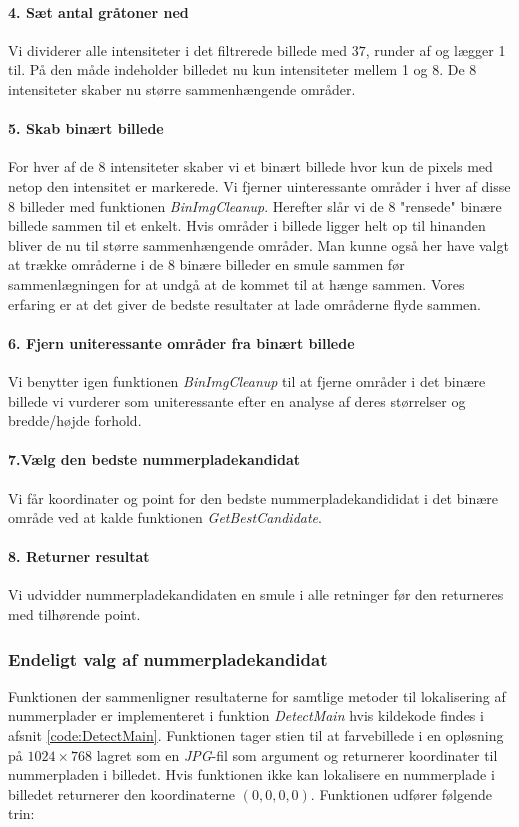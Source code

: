 \paragraph{4. Sæt antal gråtoner ned}
Vi dividerer alle intensiteter i det filtrerede billede med $37$, runder af og lægger 1 til. På den måde indeholder billedet nu kun intensiteter mellem 1 og 8. De 8 intensiteter skaber nu større sammenhængende områder.  

\paragraph{5. Skab binært billede}
For hver af de 8 intensiteter skaber vi et binært billede hvor kun de pixels med netop den intensitet er markerede. Vi fjerner uinteressante områder i hver af disse 8 billeder med funktionen \textit{BinImgCleanup}. Herefter slår vi de 8 "rensede" binære billede sammen til et enkelt. Hvis områder i billede ligger helt op til hinanden bliver de nu til større sammenhængende områder. Man kunne også her have valgt at trække områderne i de 8 binære billeder en smule sammen før sammenlægningen for at undgå at de kommet til at hænge sammen. Vores erfaring er at det giver de bedste resultater at lade områderne flyde sammen.   

\paragraph{6. Fjern uniteressante områder fra binært billede}
Vi benytter igen funktionen \textit{BinImgCleanup} til at fjerne områder i det binære billede vi vurderer som uniteressante efter en analyse af deres størrelser og bredde/højde forhold.

\paragraph{7.Vælg den bedste nummerpladekandidat}
Vi får koordinater og point for den bedste nummerpladekandididat i det binære område ved at kalde funktionen \textit{GetBestCandidate}. 

\paragraph{8. Returner resultat}
Vi udvidder nummerpladekandidaten en smule i alle retninger før den returneres med tilhørende point.

\subsubsection{Endeligt valg af nummerpladekandidat}
Funktionen der sammenligner resultaterne for samtlige metoder til lokalisering af nummerplader er implementeret i funktion \textit{DetectMain} hvis kildekode findes i afsnit \vref{code:DetectMain}. Funktionen tager stien til at farvebillede i en opløsning på $1024 \times 768$ lagret som en \textit{JPG}-fil som argument og returnerer koordinater til nummerpladen i billedet. Hvis funktionen ikke kan lokalisere en nummerplade i billedet returnerer den koordinaterne $(0,0,0,0)$. Funktionen udfører følgende trin: 

